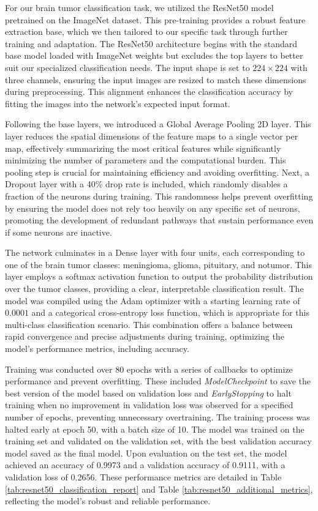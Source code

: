 For our brain tumor classification task, we utilized the ResNet50 model pretrained on the ImageNet dataset. This pre-training provides a robust feature extraction base, which we then tailored to our specific task through further training and adaptation. The ResNet50 architecture begins with the standard base model loaded with ImageNet weights but excludes the top layers to better suit our specialized classification needs. The input shape is set to $224\times224$ with three channels, ensuring the input images are resized to match these dimensions during preprocessing. This alignment enhances the classification accuracy by fitting the images into the network's expected input format.

Following the base layers, we introduced a Global Average Pooling 2D layer. This layer reduces the spatial dimensions of the feature maps to a single vector per map, effectively summarizing the most critical features while significantly minimizing the number of parameters and the computational burden. This pooling step is crucial for maintaining efficiency and avoiding overfitting. Next, a Dropout layer with a 40\% drop rate is included, which randomly disables a fraction of the neurons during training. This randomness helps prevent overfitting by ensuring the model does not rely too heavily on any specific set of neurons, promoting the development of redundant pathways that sustain performance even if some neurons are inactive.

The network culminates in a Dense layer with four units, each corresponding to one of the brain tumor classes: meningioma, glioma, pituitary, and notumor. This layer employs a softmax activation function to output the probability distribution over the tumor classes, providing a clear, interpretable classification result. The model was compiled using the Adam optimizer with a starting learning rate of $0.0001$ and a categorical cross-entropy loss function, which is appropriate for this multi-class classification scenario. This combination offers a balance between rapid convergence and precise adjustments during training, optimizing the model's performance metrics, including accuracy.

Training was conducted over 80 epochs with a series of callbacks to optimize performance and prevent overfitting. These included \textit{ModelCheckpoint} to save the best version of the model based on validation loss and \textit{EarlyStopping} to halt training when no improvement in validation loss was observed for a specified number of epochs, preventing unnecessary overtraining. The training process was halted early at epoch 50, with a batch size of 10. The model was trained on the training set and validated on the validation set, with the best validation accuracy model saved as the final model. Upon evaluation on the test set, the model achieved an accuracy of 0.9973 and a validation accuracy of 0.9111, with a validation loss of 0.2656. These performance metrics are detailed in Table \ref{tab:resnet50_classification_report} and Table \ref{tab:resnet50_additional_metrics}, reflecting the model's robust and reliable performance.

